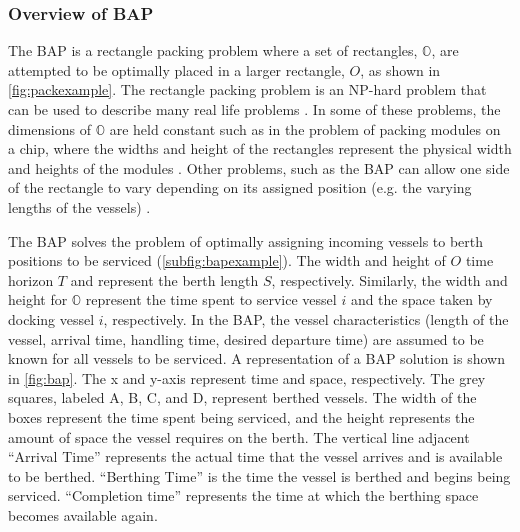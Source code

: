 \documentclass[11pt,a4paper,final]{article}
\begin{document}
\subsubsection{Overview of BAP}
\label{sec:overview-of-bap}
The BAP is a rectangle packing problem where a set of rectangles, \(\mathbb{O}\), are attempted to be optimally placed in
a larger rectangle, \(O\), as shown in \autoref{fig:packexample}. The rectangle packing problem is an NP-hard problem that
can be used to describe many real life problems \cite{bruin-2013-rectan-packin,murata-1995-rectan}. In some of these
problems, the dimensions of \(\mathbb{O}\) are held constant such as in the problem of packing modules on a chip, where
the widths and height of the rectangles represent the physical width and heights of the modules
\cite{murata-1995-rectan}. Other problems, such as the BAP can allow one side of the rectangle to vary depending on its
assigned position (e.g. the varying lengths of the vessels) \cite{buhrkal-2011-model-discr}.

The BAP solves the problem of optimally assigning incoming vessels to berth positions to be serviced
(\autoref{subfig:bapexample}). The width and height of \(O\) time horizon \(T\) and represent the berth length \(S\),
respectively. Similarly, the width and height for \(\mathbb{O}\) represent the time spent to service vessel \(i\) and the
space taken by docking vessel \(i\), respectively. In the BAP, the vessel characteristics (length of the vessel, arrival
time, handling time, desired departure time) are assumed to be known for all vessels to be serviced. A representation of
a BAP solution is shown in \autoref{fig:bap}. The x and y-axis represent time and space, respectively. The grey squares,
labeled A, B, C, and D, represent berthed vessels. The width of the boxes represent the time spent being serviced, and
the height represents the amount of space the vessel requires on the berth. The vertical line adjacent
 ``Arrival Time'' represents the actual
time that the vessel arrives and is available to be berthed. ``Berthing Time'' is the time the vessel is berthed and
begins being serviced. ``Completion time'' represents the time at which the berthing space becomes available again.
\end{document}
